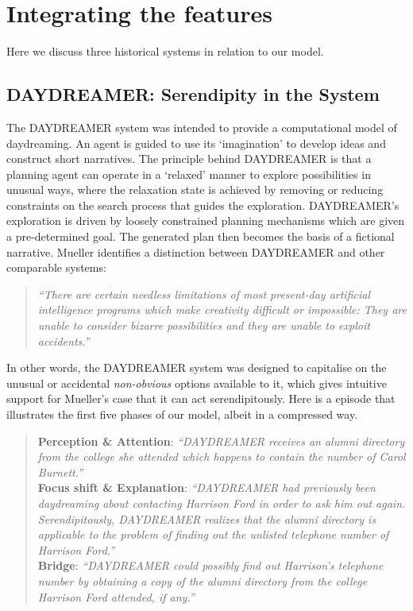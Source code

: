 \section{Integrating the features}\label{sec:system-analysis}

Here we discuss three historical systems in relation to our model. 

\subsection{{\sf DAYDREAMER}: Serendipity in the System}
The {\sf DAYDREAMER} system \cite{mueller1990} was intended to provide a computational model of daydreaming.  An agent is guided to use its `imagination' to develop ideas and construct short narratives.  The principle behind {\sf DAYDREAMER} is that a planning agent can operate in a `relaxed' manner to explore possibilities in unusual ways, where the relaxation state is achieved by removing or reducing constraints on the search process that guides the exploration.  {\sf DAYDREAMER}'s exploration is driven by loosely constrained planning mechanisms which are given a pre-determined goal.
The generated plan then becomes the basis of a fictional narrative.
Mueller identifies a distinction between {\sf DAYDREAMER} and other comparable systems:
\begin{quote}
\emph{``There are certain needless limitations of most present-day
  artificial intelligence programs which make creativity difficult or
  impossible: They are unable to consider bizarre possibilities and
  they are unable to exploit accidents.''} \cite[p. 14]{mueller1990}
\end{quote}
In other words, the {\sf DAYDREAMER} system was designed to capitalise
on the unusual or accidental {\em non-obvious} options available to
it, which gives intuitive support for Mueller's case that it can act
serendipitously.  Here is a episode that illustrates the first five
phases of our model, albeit in a compressed way.
\begin{quote}
\textbf{Perception \& Attention}: \emph{``DAYDREAMER receives an alumni directory from the college she attended which happens to contain the number of Carol Burnett.''}\\
\textbf{Focus shift \& Explanation}: \emph{``DAYDREAMER had previously been daydreaming about contacting Harrison Ford in order to ask him out again. Serendipitously, DAYDREAMER realizes that the alumni directory is applicable to the problem of finding out the unlisted telephone number of Harrison Ford.''}\\
  \textbf{Bridge}: \emph{``DAYDREAMER could possibly find out Harrison's telephone number by obtaining a copy of the alumni directory from the college Harrison Ford attended, if any.''} \cite[p. 125]{mueller1990}
\end{quote}


